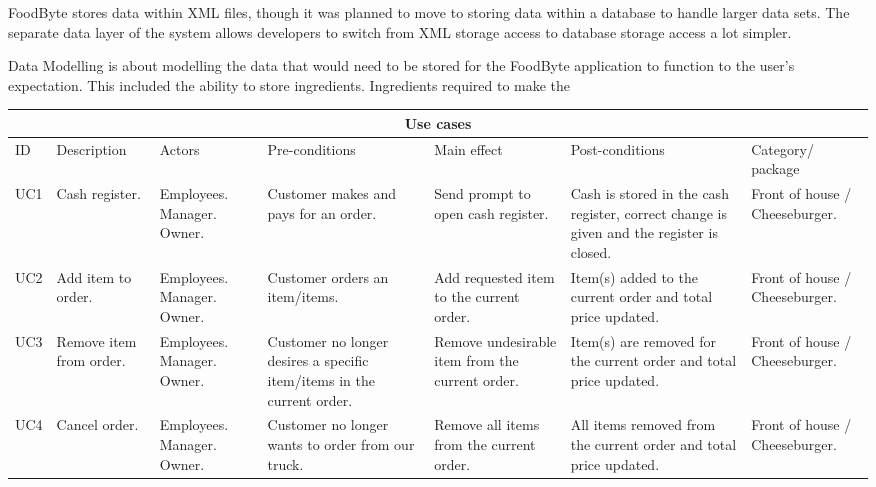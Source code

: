 FoodByte stores data within XML files, though it was planned to move to storing data within a database to handle larger data sets. The separate data layer of the system allows developers to switch from XML storage access to database storage access a lot simpler.

Data Modelling is about modelling the data that would need to be stored for the FoodByte application to function to the user's expectation. This included the ability to store ingredients. Ingredients required to make the
\begin{tabularx}{\linewidth}{|X|X|X|X|X|X|X|}
\hline
\multicolumn{7}{c}{ Use cases } \\
\hline
ID & Description & Actors & Pre-conditions & Main effect & Post-conditions & Category/ package \\
\hline
UC1 & Cash register. & Employees. Manager. Owner. & Customer makes and pays for an order. & Send prompt to open cash register. & Cash is stored in the cash register, correct change is given and the register is closed. & Front of house / Cheeseburger. \\
\hline
UC2 & Add item to order. & Employees. Manager. Owner. & Customer orders an item/items. & Add requested item to the current order. & Item(s) added to the current order and total price updated. & Front of house / Cheeseburger. \\
\hline
UC3 & Remove item from order. & Employees. Manager. Owner. & Customer no longer desires a specific item/items in the current order. & Remove undesirable item from the current order. & Item(s) are removed for the current order and total price updated. & Front of house / Cheeseburger. \\
\hline
UC4 & Cancel order. & Employees. Manager. Owner. & Customer no longer wants to order from our truck. & Remove all items from the current order. & All items removed from the current order and total price updated. & Front of house / Cheeseburger. \\
\hline
\end{tabularx}